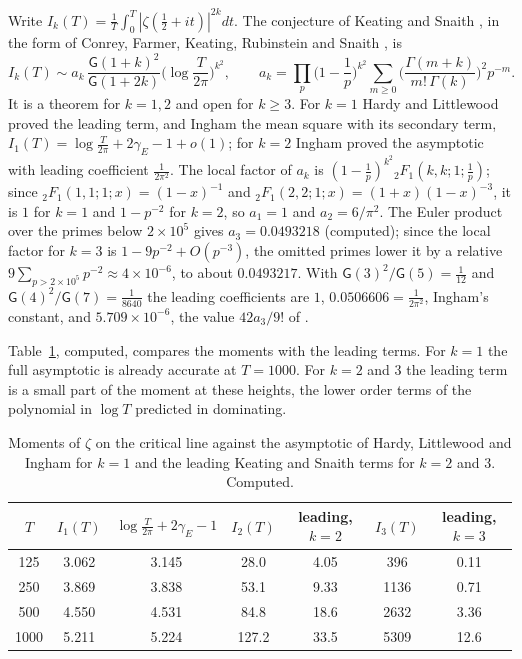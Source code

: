 Write $I_k(T)=\frac1T\int_0^T|\zeta(\frac12+it)|^{2k}dt$. The conjecture of Keating and Snaith \cite{KS00}, in the form of Conrey, Farmer, Keating, Rubinstein and Snaith \cite{CFKRS05}, is
\[
I_k(T)\sim a_k\,\frac{\mathsf G(1+k)^2}{\mathsf G(1+2k)}\Big(\log\frac T{2\pi}\Big)^{k^2},\qquad a_k=\prod_p\Big(1-\frac1p\Big)^{k^2}\sum_{m\ge0}\Big(\frac{\Gamma(m+k)}{m!\,\Gamma(k)}\Big)^2p^{-m}.
\]
It is a theorem for $k=1,2$ and open for $k\ge3$. For $k=1$ Hardy and Littlewood \cite{HL16} proved the leading term, and Ingham \cite{Ingham26} the mean square with its secondary term, $I_1(T)=\log\frac T{2\pi}+2\gamma_E-1+o(1)$; for $k=2$ Ingham \cite{Ingham26} proved the asymptotic with leading coefficient $\frac1{2\pi^2}$. The local factor of $a_k$ is $(1-\frac1p)^{k^2}{}_2F_1(k,k;1;\frac1p)$; since ${}_2F_1(1,1;1;x)=(1-x)^{-1}$ and ${}_2F_1(2,2;1;x)=(1+x)(1-x)^{-3}$, it is $1$ for $k=1$ and $1-p^{-2}$ for $k=2$, so $a_1=1$ and $a_2=6/\pi^2$. The Euler product over the primes below $2\times10^5$ gives $a_3=0.0493218$ (computed); since the local factor for $k=3$ is $1-9p^{-2}+O(p^{-3})$, the omitted primes lower it by a relative $9\sum_{p>2\times10^5}p^{-2}\approx4\times10^{-6}$, to about $0.0493217$. With $\mathsf G(3)^2/\mathsf G(5)=\frac1{12}$ and $\mathsf G(4)^2/\mathsf G(7)=\frac1{8640}$ the leading coefficients are $1$, $0.0506606=\frac1{2\pi^2}$, Ingham's constant, and $5.709\times10^{-6}$, the value $42a_3/9!$ of \cite{CFKRS05}.

Table~\ref{ag:tab:moments}, computed, compares the moments with the leading terms. For $k=1$ the full asymptotic is already accurate at $T=1000$. For $k=2$ and $3$ the leading term is a small part of the moment at these heights, the lower order terms of the polynomial in $\log T$ predicted in \cite{CFKRS05} dominating.

\begin{table}[htbp]
\centering\small
\begin{tabular}{ccccccc}
\toprule
$T$ & $I_1(T)$ & $\log\frac T{2\pi}+2\gamma_E-1$ & $I_2(T)$ & leading, $k=2$ & $I_3(T)$ & leading, $k=3$\\
\midrule
125 & 3.062 & 3.145 & 28.0 & 4.05 & 396 & 0.11\\
250 & 3.869 & 3.838 & 53.1 & 9.33 & 1136 & 0.71\\
500 & 4.550 & 4.531 & 84.8 & 18.6 & 2632 & 3.36\\
1000 & 5.211 & 5.224 & 127.2 & 33.5 & 5309 & 12.6\\
\bottomrule
\end{tabular}
\caption{Moments of $\zeta$ on the critical line against the asymptotic of Hardy, Littlewood and Ingham for $k=1$ and the leading Keating and Snaith terms for $k=2$ and $3$. Computed.}
\label{ag:tab:moments}
\end{table}

